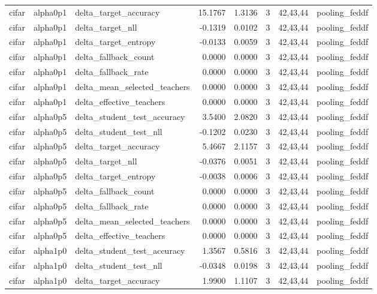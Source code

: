 \begin{tabular}{lllrrrll}
cifar & alpha0p1 & delta\_target\_accuracy & 15.1767 & 1.3136 & 3 & 42,43,44 & pooling\_feddf \\
cifar & alpha0p1 & delta\_target\_nll & -0.1319 & 0.0102 & 3 & 42,43,44 & pooling\_feddf \\
cifar & alpha0p1 & delta\_target\_entropy & -0.0133 & 0.0059 & 3 & 42,43,44 & pooling\_feddf \\
cifar & alpha0p1 & delta\_fallback\_count & 0.0000 & 0.0000 & 3 & 42,43,44 & pooling\_feddf \\
cifar & alpha0p1 & delta\_fallback\_rate & 0.0000 & 0.0000 & 3 & 42,43,44 & pooling\_feddf \\
cifar & alpha0p1 & delta\_mean\_selected\_teachers & 0.0000 & 0.0000 & 3 & 42,43,44 & pooling\_feddf \\
cifar & alpha0p1 & delta\_effective\_teachers & 0.0000 & 0.0000 & 3 & 42,43,44 & pooling\_feddf \\
cifar & alpha0p5 & delta\_student\_test\_accuracy & 3.5400 & 2.0820 & 3 & 42,43,44 & pooling\_feddf \\
cifar & alpha0p5 & delta\_student\_test\_nll & -0.1202 & 0.0230 & 3 & 42,43,44 & pooling\_feddf \\
cifar & alpha0p5 & delta\_target\_accuracy & 5.4667 & 2.1157 & 3 & 42,43,44 & pooling\_feddf \\
cifar & alpha0p5 & delta\_target\_nll & -0.0376 & 0.0051 & 3 & 42,43,44 & pooling\_feddf \\
cifar & alpha0p5 & delta\_target\_entropy & -0.0038 & 0.0006 & 3 & 42,43,44 & pooling\_feddf \\
cifar & alpha0p5 & delta\_fallback\_count & 0.0000 & 0.0000 & 3 & 42,43,44 & pooling\_feddf \\
cifar & alpha0p5 & delta\_fallback\_rate & 0.0000 & 0.0000 & 3 & 42,43,44 & pooling\_feddf \\
cifar & alpha0p5 & delta\_mean\_selected\_teachers & 0.0000 & 0.0000 & 3 & 42,43,44 & pooling\_feddf \\
cifar & alpha0p5 & delta\_effective\_teachers & 0.0000 & 0.0000 & 3 & 42,43,44 & pooling\_feddf \\
cifar & alpha1p0 & delta\_student\_test\_accuracy & 1.3567 & 0.5816 & 3 & 42,43,44 & pooling\_feddf \\
cifar & alpha1p0 & delta\_student\_test\_nll & -0.0348 & 0.0198 & 3 & 42,43,44 & pooling\_feddf \\
cifar & alpha1p0 & delta\_target\_accuracy & 1.9900 & 1.1107 & 3 & 42,43,44 & pooling\_feddf \\

\end{tabular}
